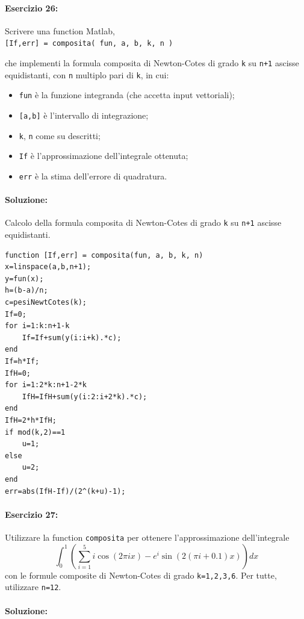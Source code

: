 \documentclass[12pt]{article}
\begin{document}
\paragraph{Esercizio 26:}
Scrivere una function Matlab, \\

\texttt{[If,err] = composita( fun, a, b, k, n )}

che implementi la formula composita di Newton-Cotes di grado \texttt{k} su \texttt{n+1} ascisse equidistanti, con \texttt{n}
multiplo pari di \texttt{k}, in cui:

\begin{itemize}
    \item \texttt{fun} è la funzione integranda (che accetta input vettoriali);
    \item \texttt{[a,b]} è l’intervallo di integrazione;
    \item \texttt{k}, \texttt{n} come su descritti;
    \item \texttt{If} è l’approssimazione dell’integrale ottenuta;
    \item \texttt{err} è la stima dell’errore di quadratura.
\end{itemize}
\paragraph{Soluzione:} Calcolo della formula composita di Newton-Cotes di grado \texttt{k} su \texttt{n+1} ascisse equidistanti.
\begin{lstlisting}[frame=single]
function [If,err] = composita(fun, a, b, k, n)
x=linspace(a,b,n+1);
y=fun(x);
h=(b-a)/n;
c=pesiNewtCotes(k);
If=0;
for i=1:k:n+1-k
    If=If+sum(y(i:i+k).*c);
end
If=h*If;
IfH=0;
for i=1:2*k:n+1-2*k
    IfH=IfH+sum(y(i:2:i+2*k).*c);
end
IfH=2*h*IfH;
if mod(k,2)==1
    u=1;
else
    u=2;
end
err=abs(IfH-If)/(2^(k+u)-1);
\end{lstlisting}



\paragraph{Esercizio 27:}
Utilizzare la function \texttt{composita} per ottenere l’approssimazione dell’integrale\\
$$\int_{0}^{1}(\sum_{i=1}^{5}i\cos(2\pi{ix})-e^{i}\sin(2(\pi{i}+0.1)x))dx$$
con le formule composite di Newton-Cotes di grado \texttt{k=1,2,3,6}. Per tutte, utilizzare \texttt{n=12}.
\paragraph{Soluzione:}
\end{document}

